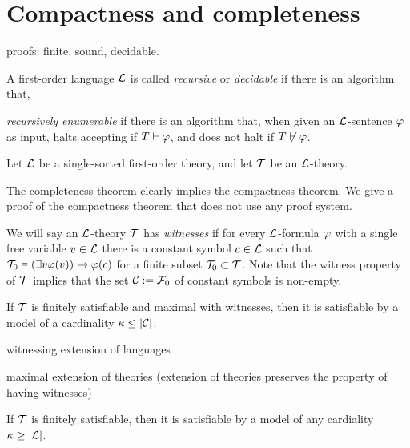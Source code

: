\documentclass{../../large}
\begin{document}
\section{Compactness and completeness}

proofs: finite, sound, decidable.

A first-order language $\mathcal{L}$ is called \emph{recursive} or \emph{decidable} if there is an algorithm that,

\emph{recursively enumerable} if there is an algorithm that, when given an $\mathcal{L}$-sentence $\varphi$ as input, halts accepting if $T\vdash\varphi$, and does not halt if $T\not\vdash\varphi$.


\begin{prb}
Let $\mathcal{L}$ be a single-sorted first-order theory, and let $\mathcal{T}$ be an $\mathcal{L}$-theory.

The completeness theorem clearly implies the compactness theorem.
We give a proof of the compactness theorem that does not use any proof system.

We will say an $\mathcal{L}$-theory $\mathcal{T}$ has \emph{witnesses} if for every $\mathcal{L}$-formula $\varphi$ with a single free variable $v\in\mathcal{L}$ there is a constant symbol $c\in\mathcal{L}$ such that $\mathcal{T}_0\vDash(\exists v\varphi(v))\to\varphi(c)$ for a finite subset $\mathcal{T}_0\subset\mathcal{T}$.
Note that the witness property of $\mathcal{T}$ implies that the set $\mathcal{C}:=\mathcal{F}_0$ of constant symbols is non-empty.

\begin{parts}
\item If $\mathcal{T}$ is finitely satisfiable and maximal with witnesses, then it is satisfiable by a model of a cardinality $\kappa\le|\mathcal{C}|$.
\item witnessing extension of languages
\item maximal extension of theories (extension of theories preserves the property of having witnesses)
\item If $\mathcal{T}$ is finitely satisfiable, then it is satisfiable by a model of any cardiality $\kappa\ge|\mathcal{L}|$.
\end{parts}
\end{prb}
\end{document}

